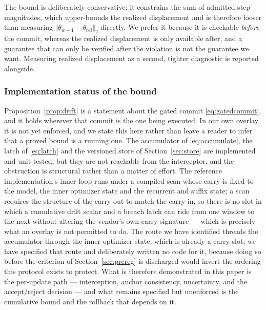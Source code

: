 \documentclass[journal]{IEEEtran}
\newcommand{\fast}{\theta}
\begin{document}
The bound is deliberately conservative: it constrains the sum of admitted step
magnitudes, which upper-bounds the realized displacement and is therefore looser
than measuring $\Vert \fast_{w+1} - \fast_{\mathrm{ref}}\Vert_2$ directly. We prefer
it because it is checkable \emph{before} the commit, whereas the realized
displacement is only available after, and a guarantee that can only be verified
after the violation is not the guarantee we want. Measuring realized displacement
as a second, tighter diagnostic is reported alongside.

\subsubsection{Implementation status of the bound}
\label{sec:driftstatus}
Proposition~\ref{prop:drift} is a statement about the gated commit
\eqref{eq:gatedcommit}, and it holds wherever that commit is the one being
executed. In our own overlay it is not yet enforced, and we state this here rather
than leave a reader to infer that a proved bound is a running one. The accumulator
of \eqref{eq:accumulate}, the latch of \eqref{eq:latch} and the versioned store of
Section~\ref{sec:store} are implemented and unit-tested, but they are not reachable
from the interceptor, and the obstruction is structural rather than a matter of
effort. The reference implementation's inner loop runs under a compiled scan whose
carry is fixed to the model, the inner optimizer state and the recurrent and suffix
state; a scan requires the structure of the carry out to match the carry in, so
there is no slot in which a cumulative drift scalar and a breach latch can ride
from one window to the next without altering the vendor's own carry signature ---
which is precisely what an overlay is not permitted to do. The route we have
identified threads the accumulator through the inner optimizer state, which is
already a carry slot; we have specified that route and deliberately written no code
for it, because doing so before the criterion of Section~\ref{sec:prereg} is
discharged would invert the ordering this protocol exists to protect. What is
therefore demonstrated in this paper is the per-update path --- interception,
anchor consistency, uncertainty, and the accept/reject decision --- and what
remains specified but unenforced is the cumulative bound and the rollback that
depends on it.
\end{document}
